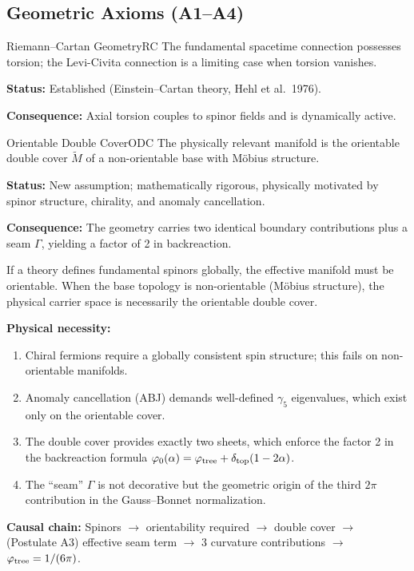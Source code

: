 \subsection{Geometric Axioms (A1--A4)}

\begin{axiom}{Riemann--Cartan Geometry}{RC}
The fundamental spacetime connection possesses torsion; the Levi-Civita 
connection is a limiting case when torsion vanishes.

\tcblower
\textbf{Status:} Established (Einstein--Cartan theory, Hehl et al.~1976).

\textbf{Consequence:} Axial torsion couples to spinor fields and is dynamically active.
\end{axiom}

\begin{axiom}{Orientable Double Cover}{ODC}
The physically relevant manifold is the orientable double cover $\widetilde{M}$ 
of a non-orientable base with M\"obius structure.

\tcblower
\textbf{Status:} New assumption; mathematically rigorous, physically motivated 
by spinor structure, chirality, and anomaly cancellation.

\textbf{Consequence:} The geometry carries two identical boundary contributions 
plus a seam $\Gamma$, yielding a factor of 2 in backreaction.
\end{axiom}

\begin{tcolorbox}[colback=blue!3, colframe=blue!40, title={\textbf{Lemma (Spin Structure Requires Orientability)}}, fonttitle=\bfseries\itshape]
If a theory defines fundamental spinors globally, the effective manifold must be 
orientable. When the base topology is non-orientable (M\"obius structure), the 
physical carrier space is necessarily the orientable double cover.

\textbf{Physical necessity:}
\begin{enumerate}[leftmargin=1.5em, topsep=2pt, itemsep=1pt]
    \item Chiral fermions require a globally consistent spin structure; this fails 
        on non-orientable manifolds.
    \item Anomaly cancellation (ABJ) demands well-defined $\gamma_5$ eigenvalues, 
        which exist only on the orientable cover.
    \item The double cover provides exactly two sheets, which enforce the factor 2 
        in the backreaction formula $\varphi_0(\alpha) = \varphi_{\mathrm{tree}} + \delta_{\mathrm{top}}(1-2\alpha)$.
    \item The ``seam'' $\Gamma$ is not decorative but the geometric origin of the 
        third $2\pi$ contribution in the Gauss--Bonnet normalization.
\end{enumerate}

\textbf{Causal chain:} Spinors $\to$ orientability required $\to$ double cover 
$\to$ (Postulate A3) effective seam term $\to$ 3 curvature contributions $\to$ $\varphi_{\mathrm{tree}} = 1/(6\pi)$.
\end{tcolorbox}

